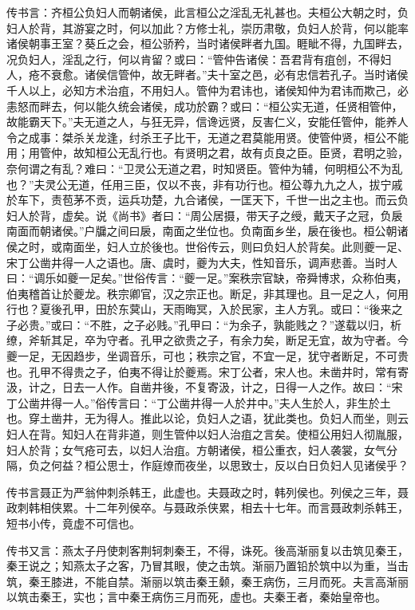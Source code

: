 \documentclass[]{article}
\begin{document}
传书言：齐桓公负妇人而朝诸侯，此言桓公之淫乱无礼甚也。夫桓公大朝之时，负妇人於背，其游宴之时，何以加此？方修士礼，崇历肃敬，负妇人於背，何以能率诸侯朝事王室？葵丘之会，桓公骄矜，当时诸侯畔者九国。睚眦不得，九国畔去，况负妇人，淫乱之行，何以肯留？或曰：``管仲告诸侯：吾君背有疽创，不得妇人，疮不衰愈。诸侯信管仲，故无畔者。''夫十室之邑，必有忠信若孔子。当时诸侯千人以上，必知方术治疽，不用妇人。管仲为君讳也，诸侯知仲为君讳而欺己，必恚怒而畔去，何以能久统会诸侯，成功於霸？或曰：``桓公实无道，任贤相管仲，故能霸天下。''夫无道之人，与狂无异，信谗远贤，反害仁义，安能任管仲，能养人令之成事：桀杀关龙逢，纣杀王子比干，无道之君莫能用贤。使管仲贤，桓公不能用；用管仲，故知桓公无乱行也。有贤明之君，故有贞良之臣。臣贤，君明之验，奈何谓之有乱？难曰：``卫灵公无道之君，时知贤臣。管仲为辅，何明桓公不为乱也？''夫灵公无道，任用三臣，仅以不丧，非有功行也。桓公尊九九之人，拔宁戚於车下，责苞茅不贡，运兵功楚，九合诸侯，一匡天下，千世一出之主也。而云负妇人於背，虚矣。说《尚书》者曰：``周公居摄，带天子之绶，戴天子之冠，负扆南面而朝诸侯。''户牖之间曰扆，南面之坐位也。负南面乡坐，扆在後也。桓公朝诸侯之时，或南面坐，妇人立於後也。世俗传云，则曰负妇人於背矣。此则夔一足、宋丁公凿井得一人之语也。唐、虞时，夔为大夫，性知音乐，调声悲善。当时人曰：``调乐如夔一足矣。''世俗传言：``夔一足。''案秩宗官缺，帝舜博求，众称伯夷，伯夷稽首让於夔龙。秩宗卿官，汉之宗正也。断足，非其理也。且一足之人，何用行也？夏後孔甲，田於东蓂山，天雨晦冥，入於民家，主人方乳。或曰：``後来之子必贵。''或曰：``不胜，之子必贱。''孔甲曰：``为余子，孰能贱之？''遂载以归，析缭，斧斩其足，卒为守者。孔甲之欲贵之子，有余力矣，断足无宜，故为守者。今夔一足，无因趋步，坐调音乐，可也；秩宗之官，不宜一足，犹守者断足，不可贵也。孔甲不得贵之子，伯夷不得让於夔焉。宋丁公者，宋人也。未凿井时，常有寄汲，计之，日去一人作。自凿井後，不复寄汲，计之，日得一人之作。故曰：``宋丁公凿井得一人。''俗传言曰：``丁公凿井得一人於井中。''夫人生於人，非生於土也。穿土凿井，无为得人。推此以论，负妇人之语，犹此类也。负妇人而坐，则云妇人在背。知妇人在背非道，则生管仲以妇人治疽之言矣。使桓公用妇人彻胤服，妇人於背；女气疮可去，以妇人治疽。方朝诸侯，桓公重衣，妇人袭裳，女气分隔，负之何益？桓公思士，作庭燎而夜坐，以思致士，反以白日负妇人见诸侯乎？

传书言聂正为严翁仲刺杀韩王，此虚也。夫聂政之时，韩列侯也。列侯之三年，聂政刺韩相侠累。十二年列侯卒。与聂政杀侠累，相去十七年。而言聂政刺杀韩王，短书小传，竟虚不可信也。

传书又言：燕太子丹使刺客荆轲刺秦王，不得，诛死。後高渐丽复以击筑见秦王，秦王说之；知燕太子之客，乃冒其眼，使之击筑。渐丽乃置铅於筑中以为重，当击筑，秦王膝进，不能自禁。渐丽以筑击秦王颡，秦王病伤，三月而死。夫言高渐丽以筑击秦王，实也；言中秦王病伤三月而死，虚也。夫秦王者，秦始皇帝也。
\end{document}
